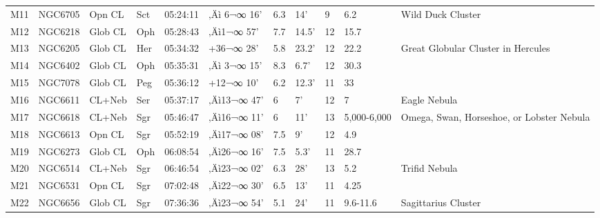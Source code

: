 \documentclass[10pt,twoside,a4paper,english]{report}
\begin{document}
\begin{longtable}{@{}lllllllllll@{}}
M11        & NGC6705     & Opn CL     & Sct       & 05:24:11 & ‚Äì 6¬∞ 16'  & 6.3       & 14'                  & 9        & 6.2                 & Wild Duck Cluster                         \\ 
M12        & NGC6218     & Glob CL    & Oph       & 05:28:43 & ‚Äì1¬∞ 57'   & 7.7       & 14.5'                & 12       & 15.7                &                                           \\ 
M13        & NGC6205     & Glob CL    & Her       & 05:34:32 & +36¬∞ 28'  & 5.8       & 23.2'                & 12       & 22.2                & Great Globular Cluster in Hercules        \\ 
M14        & NGC6402     & Glob CL    & Oph       & 05:35:31 & ‚Äì 3¬∞ 15'  & 8.3       & 6.7'                 & 12       & 30.3                &                                           \\ 
M15        & NGC7078     & Glob CL    & Peg       & 05:36:12 & +12¬∞ 10'  & 6.2       & 12.3'                & 11       & 33                  &                                           \\ 
M16        & NGC6611     & CL+Neb     & Ser       & 05:37:17 & ‚Äì13¬∞ 47'  & 6         & 7'                   & 12       & 7                   & Eagle Nebula                              \\ 
M17        & NGC6618     & CL+Neb     & Sgr       & 05:46:47 & ‚Äì16¬∞ 11'  & 6         & 11'                  & 13       & 5,000-6,000         & Omega, Swan, Horseshoe, or Lobster Nebula \\ 
M18        & NGC6613     & Opn CL     & Sgr       & 05:52:19 & ‚Äì17¬∞ 08'  & 7.5       & 9'                   & 12       & 4.9                 &                                           \\ 
M19        & NGC6273     & Glob CL    & Oph       & 06:08:54 & ‚Äì26¬∞ 16'  & 7.5       & 5.3'                 & 11       & 28.7                &                                           \\ 
M20        & NGC6514     & CL+Neb     & Sgr       & 06:46:54 & ‚Äì23¬∞ 02'  & 6.3       & 28'                  & 13       & 5.2                 & Trifid Nebula                             \\ 
M21        & NGC6531     & Opn CL     & Sgr       & 07:02:48 & ‚Äì22¬∞ 30'  & 6.5       & 13'                  & 11       & 4.25                &                                           \\ 
M22        & NGC6656     & Glob CL    & Sgr       & 07:36:36 & ‚Äì23¬∞ 54'  & 5.1       & 24'                  & 11       & 9.6-11.6            & Sagittarius Cluster                       \\ 

\end{longtable}
\end{document}
